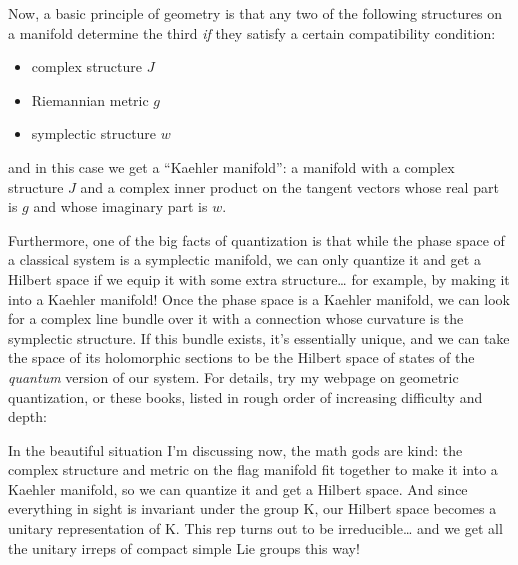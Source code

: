 \documentclass{article}
\def\tightlist{}
\renewcommand{\texttt}[1]{%
  \begingroup
  \ttfamily
  \begingroup\lccode`~=`/\lowercase{\endgroup\def~}{/\discretionary{}{}{}}%
  \begingroup\lccode`~=`[\lowercase{\endgroup\def~}{[\discretionary{}{}{}}%
  \begingroup\lccode`~=`.\lowercase{\endgroup\def~}{.\discretionary{}{}{}}%
  \catcode`/=\active\catcode`[=\active\catcode`.=\active
  \scantokens{#1\noexpand}%
  \endgroup
}
\begin{document}
Now, a basic principle of geometry is that any two of the following
structures on a manifold determine the third \emph{if} they satisfy a
certain compatibility condition:

\begin{itemize}
\tightlist
\item
  complex structure \(J\)
\item
  Riemannian metric \(g\)
\item
  symplectic structure \(w\)
\end{itemize}

and in this case we get a ``Kaehler manifold'': a manifold with a
complex structure \(J\) and a complex inner product on the tangent
vectors whose real part is \(g\) and whose imaginary part is \(w\).

Furthermore, one of the big facts of quantization is that while the
phase space of a classical system is a symplectic manifold, we can only
quantize it and get a Hilbert space if we equip it with some extra
structure\ldots{} for example, by making it into a Kaehler manifold!
Once the phase space is a Kaehler manifold, we can look for a complex
line bundle over it with a connection whose curvature is the symplectic
structure. If this bundle exists, it's essentially unique, and we can
take the space of its holomorphic sections to be the Hilbert space of
states of the \emph{quantum} version of our system. For details, try my
webpage on geometric quantization, or these books, listed in rough order
of increasing difficulty and depth:


In the beautiful situation I'm discussing now, the math gods are kind:
the complex structure and metric on the flag manifold fit together to
make it into a Kaehler manifold, so we can quantize it and get a Hilbert
space. And since everything in sight is invariant under the group K, our
Hilbert space becomes a unitary representation of K. This rep turns out
to be irreducible\ldots{} and we get all the unitary irreps of compact
simple Lie groups this way!
\end{document}
